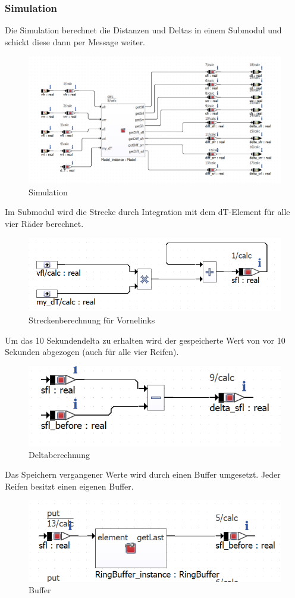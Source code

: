 \subsubsection{Simulation}
Die Simulation berechnet die Distanzen und Deltas in einem Submodul und schickt diese dann per Message weiter.
\begin{figure}[H]
	\centering
\includegraphics[width=1\linewidth]{../Graphiken/ModelSim}
\caption{Simulation}
\label{fig:Sim1}
\end{figure}
Im Submodul wird die Strecke durch Integration mit dem dT-Element für alle vier Räder berechnet.
\begin{figure}[H]
	\centering
	\includegraphics[width=0.6\linewidth]{../Graphiken/integrate}
	\caption{Streckenberechnung für Vornelinks}
	\label{fig:Sim2}
\end{figure}
Um das 10 Sekundendelta zu erhalten wird der gespeicherte Wert von vor 10 Sekunden abgezogen (auch für alle vier Reifen).
\begin{figure}[H]
	\centering
	\includegraphics[width=0.5\linewidth]{../Graphiken/delta}
	\caption{Deltaberechnung}
	\label{fig:delta}
\end{figure}
Das Speichern vergangener Werte wird durch einen Buffer umgesetzt. Jeder Reifen besitzt einen eigenen Buffer.
\begin{figure}[H]
	\centering
	\includegraphics[width=0.6\linewidth]{../Graphiken/RinbufferApp}
	\caption{Buffer}
	\label{fig:Buffer}
\end{figure}

